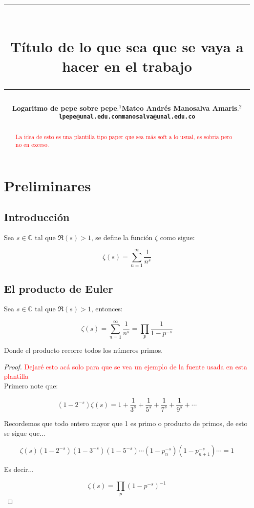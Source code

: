 \documentclass[12pt]{article}
\title{\vspace{-2cm}\par\noindent\rule{16cm}{1pt}\large
\\\bfseries Título de lo que sea que se vaya a hacer en el trabajo
\vspace{-0.34cm}\par\noindent\hspace{0.15cm}\rule{16cm}{1pt}
\vspace{-0.2cm}
}
\author{\small \bfseries Logaritmo de pepe sobre pepe$.^1$\small \phantom{lkllkhhhhhhh}Mateo Andrés Manosalva Amaris$.^{2}$\\ \small \texttt{lpepe@unal.edu.co}\hspace{3.6cm}\texttt{mmanosalva@unal.edu.co}
}
\begin{document}
\maketitle
\begin{abstract}
\textcolor{red}{La idea de esto es una plantilla tipo paper que sea más soft a lo usual, es sobria pero no en exceso.}\lipsum[1]
\end{abstract}

\section{Preliminares}

\subsection{Introducción}
\lipsum[2]
\begin{definition}
Sea $s \in \mathbb{C}$ tal que $\Re(s)>1$, se define la función $\zeta$ como sigue:

$$\zeta(s)=\sum_{n=1}^{\infty}\dfrac{1}{n^s}$$
\end{definition}

\begin{note}
   \lipsum[3]
\end{note}

\lipsum[4]

\subsection{El producto de Euler}

\lipsum[3]

\begin{theorem}
    Sea $s\in \mathbb{C}$ tal que $\Re(s)>1$, entonces:

    $$\zeta(s)=\sum_{n=1}^{\infty}\dfrac{1}{n^s}=\prod_p \dfrac{1}{1-p^{-s}}$$

    Donde el producto recorre todos los números primos.
\end{theorem}


\begin{proof}

\textcolor{red}{Dejaré esto acá solo para que se vea un ejemplo de la fuente usada en esta plantilla}\\

    Primero note que:

    $$(1-2^{-s})\zeta(s)=1+\dfrac{1}{3^s}+\dfrac{1}{5^s}+\dfrac{1}{7^s}+\dfrac{1}{9^s}+\cdots$$

    Recordemos que todo entero mayor que 1 es primo o producto de primos, de esto se sigue que...

    $$\zeta(s)\left(1-2^{-s}\right)(1-3^{-s})(1-5^{-s})\cdots(1-p_n^{-s})(1-p_{n+1}^{-s})\cdots=1$$

    Es decir...

    $$\zeta(s)=\prod_p (1-p^{-s})^{-1}$$
\end{proof}
\end{document}
